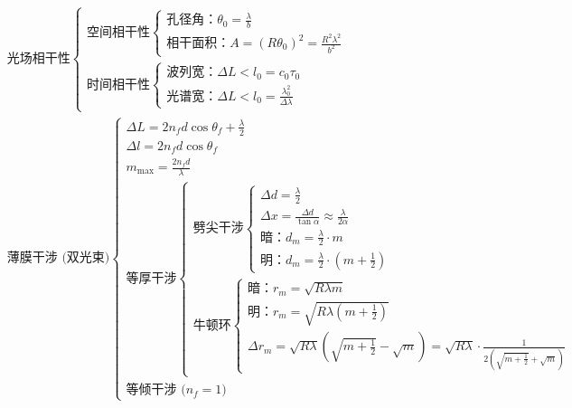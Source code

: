 \documentclass[UTF8]{report}
\theoremstyle{MyLineTheoremStyle} %
\theoremstyle{MyBlockTheoremStyle} %
\theoremstyle{MySubsubsectionStyle} %
\begin{document}
\newpage
\begin{align*}
&
\text{光场相干性} 
\begin{cases}
    \text{空间相干性}
        \begin{cases}
            \text{孔径角：} \theta_0 = \frac{\lambda}{b} \\ 
            \text{相干面积：} A = \left(R \theta_0\right)^2 = \frac{R^2\lambda^2}{b^2}
        \end{cases}\\ 
    \text{时间相干性}
        \begin{cases}
            \text{波列宽：} \Delta L < l_0 = c_0\tau_0 \\ 
            \text{光谱宽：} \Delta L < l_0 = \frac{\lambda_0^2}{\Delta \lambda}
        \end{cases}
\end{cases}
\\ &
\text{薄膜干涉 (双光束)}
\begin{cases}
\Delta L = 2n_fd \cos \theta_f + \frac{\lambda}{2} \\ 
\Delta l = 2n_fd \cos \theta_f \\ 
m_{\max} = \frac{2n_fd}{\lambda} \\ 
\text{等厚干涉} 
    \begin{cases}
        \text{劈尖干涉} 
            \begin{cases}
                \Delta d = \frac{\lambda}{2} \\ 
                \Delta x = \frac{\Delta d}{\tan \alpha} \approx \frac{\lambda}{2 \alpha} \\
                \text{暗：}d_m = \frac{\lambda}{2} \cdot m \\ 
                \text{明：}d_m = \frac{\lambda}{2} \cdot \left(m + \frac{1}{2}\right)
            \end{cases}\\ 
        \text{牛顿环}
            \begin{cases}
                \text{暗：} r_m = \sqrt{R\lambda m} \\ 
                \text{明：} r_m = \sqrt{R\lambda \left(m + \frac{1}{2}\right)} \\ 
                \Delta r_m = \sqrt{R\lambda} \left(\sqrt{m + \frac{1}{2}} - \sqrt{m}\right) = \sqrt{R\lambda}\cdot \frac{1}{2\left(\sqrt{m + \frac{1}{2}} + \sqrt{m}\right)}
            \end{cases}
    \end{cases}\\ 
\text{等倾干涉 ($n_f = 1$)}

\end{cases}
\end{align*}
\end{document}
